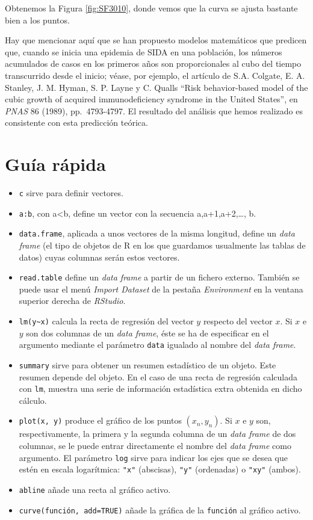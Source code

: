 \documentclass[
]{book}
\providecommand{\tightlist}{%
  \setlength{\itemsep}{0pt}\setlength{\parskip}{0pt}}
\theoremstyle{definition}
\theoremstyle{definition}
\theoremstyle{definition}
\theoremstyle{remark}
\begin{document}
Obtenemos la Figura
\ref{fig:SF3010}, donde vemos que la curva se ajusta bastante bien a los puntos.

Hay que mencionar aquí que se han propuesto modelos matemáticos que predicen que, cuando se inicia una epidemia de SIDA en una población, los números acumulados de casos en los primeros años son proporcionales al cubo del tiempo transcurrido desde el inicio; véase, por ejemplo, el artículo de S.A. Colgate, E. A. Stanley, J. M. Hyman, S. P. Layne y C. Qualls ``Risk behavior-based model of the cubic growth of acquired immunodeficiency syndrome in the United States'', en \emph{PNAS} 86 (1989), pp.~4793-4797. El resultado del análisis que hemos realizado es consistente con esta predicción teórica.

\hypertarget{guuxeda-ruxe1pida-2}{%
\section{Guía rápida}\label{guuxeda-ruxe1pida-2}}

\begin{itemize}
\tightlist
\item
  \texttt{c} sirve para definir vectores.
\item
  \texttt{a:b}, con a\textless b, define un vector con la secuencia a,a+1,a+2,\ldots, b.
\item
  \texttt{data.frame}, aplicada a unos vectores de la misma longitud, define un \emph{data frame} (el tipo de objetos de R en los que guardamos usualmente las tablas de datos) cuyas columnas serán estos vectores.
\item
  \texttt{read.table} define un \emph{data frame} a partir de un fichero externo. También se puede usar el menú \emph{Import Dataset} de la pestaña \emph{Environment} en la ventana superior derecha de \emph{RStudio}.
\item
  \texttt{lm(y\textasciitilde{}x)} calcula la recta de regresión del vector \(y\) respecto del vector \(x\). Si \(x\) e \(y\) son dos columnas de un \emph{data frame}, éste se ha de especificar en el argumento mediante el parámetro \texttt{data} igualado al nombre del \emph{data frame}.
\item
  \texttt{summary} sirve para obtener un resumen estadístico de un objeto. Este resumen depende del objeto. En el caso de una recta de regresión calculada con \texttt{lm}, muestra una serie de información estadística extra obtenida en dicho cálculo.
\item
  \texttt{plot(x,\ y)} produce el gráfico de los puntos \((x_n,y_n)\). Si \(x\) e \(y\) son, respectivamente, la primera y la segunda columna de un \emph{data frame} de dos columnas, se le puede entrar directamente el nombre del \emph{data frame} como argumento. El parámetro \texttt{log} sirve para indicar los ejes que se desea que estén en escala logarítmica: \texttt{"x"} (abscisas),
  \texttt{"y"} (ordenadas) o \texttt{"xy"} (ambos).
\item
  \texttt{abline} añade una recta al gráfico activo.
\item
  \texttt{curve(función,\ add=TRUE)} añade la gráfica de la \texttt{función} al gráfico activo.
\end{itemize}
\end{document}
